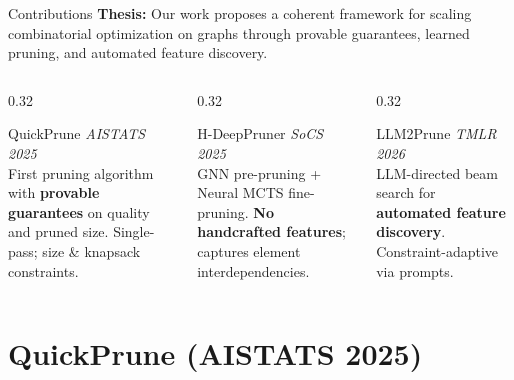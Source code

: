 \documentclass[aspectratio=169,xcolor=dvipsnames,8pt]{beamer}
\begin{document}
\begin{frame}{Contributions}
  \textbf{Thesis:} Our work proposes a coherent framework for scaling
  combinatorial optimization on graphs through provable guarantees, learned
  pruning, and automated feature discovery.

  \vspace{0.25cm}

  \begin{columns}[T]
    \begin{column}{0.32\textwidth}
      \begin{block}{\faCheckCircle\; QuickPrune}
        \textit{AISTATS 2025}~\cite{pmlr-v258-nath25a}\\[4pt]
        First pruning algorithm with \textbf{provable guarantees} on quality and pruned size.
        Single-pass; size \& knapsack constraints.
      \end{block}
    \end{column}
    \begin{column}{0.32\textwidth}
      \begin{block}{\faCheckCircle\; H-DeepPruner}
        \textit{SoCS 2025}~\cite{nath2025hdeeppruner}\\[4pt]
        GNN pre-pruning + Neural MCTS fine-pruning.
        \textbf{No handcrafted features}; captures element interdependencies.
      \end{block}
    \end{column}
    \begin{column}{0.32\textwidth}
      \begin{block}{\faCheckCircle\; LLM2Prune}
        \textit{TMLR 2026}~\cite{nath2026llmprune}\\[4pt]
        LLM-directed beam search for \textbf{automated feature discovery}.
        Constraint-adaptive via prompts.
      \end{block}
    \end{column}
  \end{columns}
\end{frame}

\section{QuickPrune (AISTATS 2025)}
\end{document}
